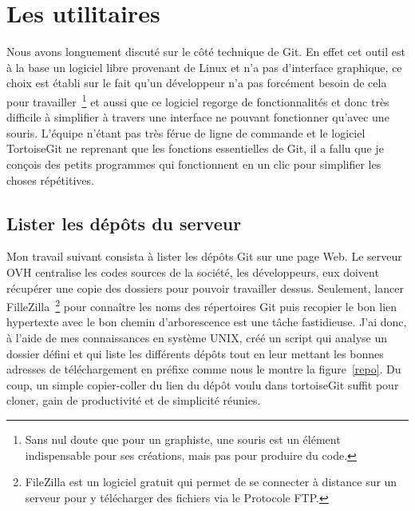 \section{Les utilitaires} %
\label{sec:Les utilitaires}

Nous avons longuement discuté sur le côté technique de Git. En effet cet
outil est à la base un logiciel libre provenant de Linux et n'a pas
d'interface graphique, ce choix est établi sur le fait qu'un développeur
n'a pas forcément besoin de cela pour travailler\, \footnote{Sans nul
doute que pour un graphiste, une souris est un élément indispensable
pour ses créations, mais pas pour produire du code.} et aussi que ce
logiciel regorge de fonctionnalités et donc très difficile à simplifier
à travers une interface ne pouvant fonctionner qu'avec une souris.
L'équipe n'étant pas très férue de ligne de commande et le logiciel
TortoiseGit ne reprenant que les fonctions essentielles de Git, il a
fallu que je conçois des petits programmes qui fonctionnent en un clic
pour simplifier les choses répétitives.

\subsection{Lister les dépôts du serveur} %
\label{sub:Lister les dépôts du serveur}

Mon travail suivant consista à lister les dépôts Git sur une page Web.
Le serveur OVH centralise les codes sources de la société, les
développeurs, eux doivent récupérer une copie des dossiers pour pouvoir
travailler dessus. Seulement, lancer FilleZilla\, \footnote{FileZilla
est un logiciel gratuit qui permet de se connecter à distance sur un
serveur pour y télécharger des fichiers via le Protocole FTP.} pour
connaître les noms des répertoires Git puis recopier le bon lien
hypertexte avec le bon chemin d'arborescence est une tâche fastidieuse.
J'ai donc, à l'aide de mes connaissances en système UNIX, créé un script
qui analyse un dossier défini et qui liste les différents dépôts tout en
leur mettant les bonnes adresses de téléchargement en préfixe comme nous
le montre la figure~\ref{repo}. Du coup, un simple copier-coller du lien
du dépôt voulu dans tortoiseGit suffit pour cloner, gain de productivité
et de simplicité réunies.

